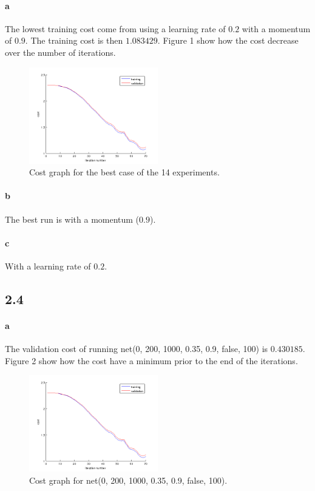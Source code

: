 \documentclass{article}
\begin{document}
\paragraph{a}
The lowest training cost come from using a learning rate of $0.2$ with a momentum of $0.9$.
The training cost is then $1.083429$. Figure 1 show how the cost decrease over the number of iterations.


\begin{figure}[h!]
  \centering
    \includegraphics[width=0.5\textwidth]{pics/prob23a.png}
    \caption{Cost graph for the best case of the 14 experiments.}
\end{figure}

\paragraph{b}

The best run is with a momentum ($0.9$).

\paragraph{c}

With a learning rate of $0.2$.

\subsection*{2.4}

\paragraph{a}

The validation cost of running net(0, 200, 1000, 0.35, 0.9, false, 100) is
$0.430185$. Figure 2 show how the cost have a minimum prior to the end of the iterations.

\begin{figure}[h!]
  \centering
    \includegraphics[width=0.5\textwidth]{pics/prob23a.png}
    \caption{Cost graph for net(0, 200, 1000, 0.35, 0.9, false, 100).}
\end{figure}
\end{document}
